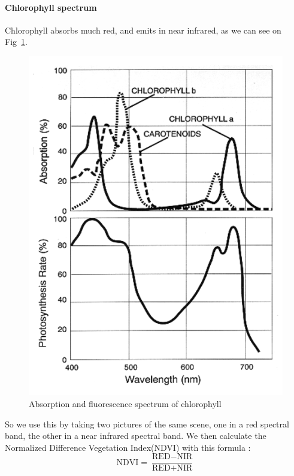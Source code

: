 \documentclass[twocolumn,10pt]{article}
\begin{document}
        \paragraph*{Chlorophyll spectrum} Chlorophyll absorbs much red, and emits in near infrared, as we can see on Fig~\ref{spectrum_chl}.
        \begin{figure}[!h]
        \includegraphics[scale=.4]{Par_action_spectrum.png}
        \caption{Absorption and fluorescence spectrum of chlorophyll}
        \label{spectrum_chl}
        \end{figure}
        \par So we use this by taking two pictures of the same scene, one in a red spectral band, the other in a near infrared spectral band. We then calculate the Normalized Difference Vegetation Index(NDVI) with this formula :
         \[ \textrm{NDVI} = \frac{\textrm{RED}-\textrm{NIR}}{\textrm{RED}+\textrm{NIR}} \]
\end{document}
